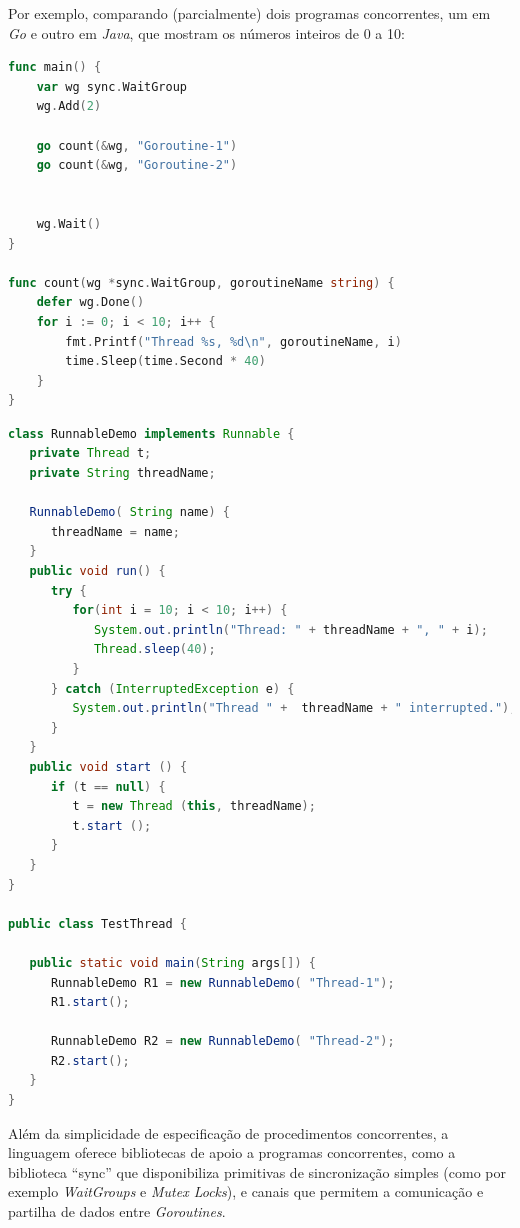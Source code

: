 Por exemplo, comparando (parcialmente) dois programas concorrentes, um em \emph{Go} e outro em \emph{Java}, que mostram os números inteiros de 0 a 10:
\begin{lstlisting}[caption={Exemplo em \emph{Go}, usando a \emph{keyword} ``go'' para começar uma \emph{Goroutine}.},language=Go]
func main() {
	var wg sync.WaitGroup
	wg.Add(2)

	go count(&wg, "Goroutine-1")
	go count(&wg, "Goroutine-2")


	wg.Wait()
}

func count(wg *sync.WaitGroup, goroutineName string) {
	defer wg.Done()
	for i := 0; i < 10; i++ {
		fmt.Printf("Thread %s, %d\n", goroutineName, i)
		time.Sleep(time.Second * 40)
	}
}
\end{lstlisting}


\begin{lstlisting}[caption={Exemplo em \emph{Java}, usando a \emph{interface} ``Runnable'' e uma classe``RunnableDemo'' para começar \emph{threads}.},language=Java]
class RunnableDemo implements Runnable {
   private Thread t;
   private String threadName;
   
   RunnableDemo( String name) {
      threadName = name;
   }
   public void run() {
      try {
         for(int i = 10; i < 10; i++) {
            System.out.println("Thread: " + threadName + ", " + i);
            Thread.sleep(40);
         }
      } catch (InterruptedException e) {
         System.out.println("Thread " +  threadName + " interrupted.");
      }
   }
   public void start () {
      if (t == null) {
         t = new Thread (this, threadName);
         t.start ();
      }
   }
}

public class TestThread {

   public static void main(String args[]) {
      RunnableDemo R1 = new RunnableDemo( "Thread-1");
      R1.start();
      
      RunnableDemo R2 = new RunnableDemo( "Thread-2");
      R2.start();
   }   
}

\end{lstlisting}

Além da simplicidade de especificação de procedimentos concorrentes, a linguagem oferece bibliotecas de apoio a programas concorrentes, como a biblioteca ``sync'' que disponibiliza primitivas de sincronização simples (como por exemplo \emph{WaitGroups} e \emph{Mutex Locks}), e canais que permitem a comunicação e partilha de dados entre \emph{Goroutines}.


